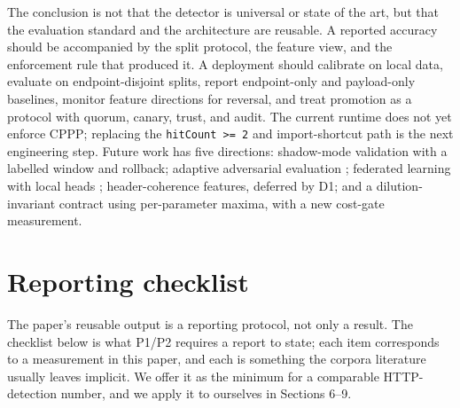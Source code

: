 \documentclass[preprint,11pt]{elsarticle}
\begin{document}
The conclusion is not that the detector is universal or state of the
art, but that the evaluation standard and the architecture are reusable.
A reported accuracy should be accompanied by the split protocol, the
feature view, and the enforcement rule that produced it. A deployment
should calibrate on local data, evaluate on endpoint-disjoint splits,
report endpoint-only and payload-only baselines, monitor feature
directions for reversal, and treat promotion as a protocol with quorum,
canary, trust, and audit. The current runtime does not yet enforce CPPP;
replacing the \texttt{hitCount\ \textgreater{}=\ 2} and import-shortcut
path is the next engineering step. Future work has five directions:
shadow-mode validation with a labelled window and rollback; adaptive
adversarial evaluation \citep{biggio2018wild}; federated learning with
local heads \citep{mcmahan2017communication, kairouz2021advances};
header-coherence features, deferred by D1; and a dilution-invariant
contract using per-parameter maxima, with a new cost-gate measurement.

\section{Reporting checklist}\label{reporting-checklist}

The paper's reusable output is a reporting protocol, not only a result.
The checklist below is what P1/P2 requires a report to state; each item
corresponds to a measurement in this paper, and each is something the
corpora literature usually leaves implicit. We offer it as the minimum
for a comparable HTTP-detection number, and we apply it to ourselves in
Sections 6--9.
\end{document}
